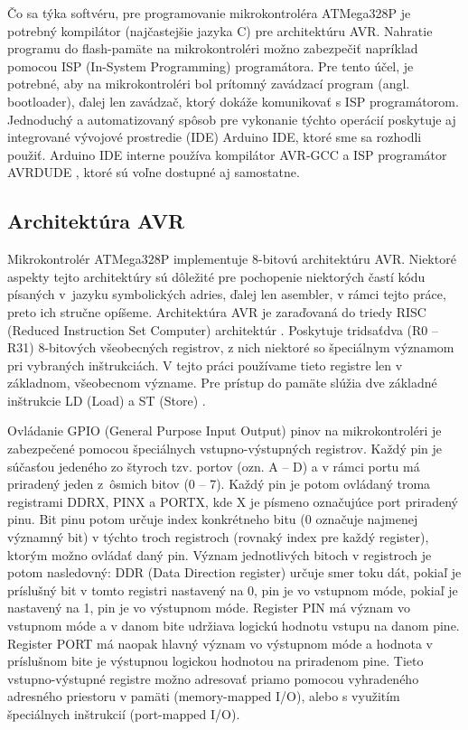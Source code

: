 Čo sa týka softvéru, pre programovanie mikrokontroléra ATMega328P je potrebný kompilátor (najčastejšie jazyka C) pre architektúru AVR. Nahratie programu do flash-pamäte na mikrokontroléri možno zabezpečiť napríklad pomocou ISP (In-System Programming) programátora. Pre tento účel, je potrebné, aby na mikrokontroléri bol prítomný zavádzací program (angl. bootloader), ďalej len zavádzač, ktorý dokáže komunikovať s ISP programátorom. Jednoduchý a automatizovaný spôsob pre vykonanie týchto operácií poskytuje aj integrované vývojové prostredie (IDE) Arduino IDE, ktoré sme sa rozhodli použiť. Arduino IDE interne používa kompilátor AVR-GCC a ISP programátor AVRDUDE \cite{avrdude}, ktoré sú voľne dostupné aj samostatne.

\subsection{Architektúra AVR}
Mikrokontrolér ATMega328P implementuje 8-bitovú architektúru AVR. Niektoré aspekty tejto architektúry sú dôležité pre pochopenie niektorých častí kódu písaných v~jazyku symbolických adries, ďalej len asembler, v rámci tejto práce, preto ich stručne opíšeme. Architektúra AVR je zaraďovaná do triedy RISC (Reduced Instruction Set Computer) architektúr \cite{avrInstruction}. Poskytuje tridsaťdva (R0 -- R31) 8-bitových všeobecných registrov, z nich niektoré so špeciálnym významom pri vybraných inštrukciách. V tejto práci používame tieto registre len v základnom, všeobecnom význame. Pre prístup do pamäte slúžia dve základné inštrukcie LD (Load) a ST (Store) \cite{avrInstruction}. 

Ovládanie GPIO (General Purpose Input Output) pinov na mikrokontroléri je zabezpečené pomocou špeciálnych vstupno-výstupných registrov. Každý pin je súčasťou jedeného zo štyroch tzv. portov (ozn. A -- D) a v rámci portu má priradený jeden z~ôsmich bitov (0 -- 7). Každý pin je potom ovládaný troma registrami DDRX, PINX a PORTX, kde X je písmeno označujúce port priradený pinu. Bit pinu potom určuje index konkrétneho bitu (0 označuje najmenej významný bit) v týchto troch registroch (rovnaký index pre každý register), ktorým možno ovládať daný pin. Význam jednotlivých bitoch v registroch je potom nasledovný: DDR (Data Direction register) určuje smer toku dát, pokiaľ je príslušný bit v tomto registri nastavený na 0, pin je vo vstupnom móde, pokiaľ je nastavený na 1, pin je vo výstupnom móde. Register PIN má význam vo vstupnom móde a v danom bite udržiava logickú hodnotu vstupu na danom pine. Register PORT má naopak hlavný význam vo výstupnom móde a hodnota v príslušnom bite je výstupnou logickou hodnotou na priradenom pine. Tieto vstupno-výstupné registre možno adresovať priamo pomocou vyhradeného adresného priestoru v pamäti (memory-mapped I/O), alebo s využitím špeciálnych inštrukcií (port-mapped I/O).


